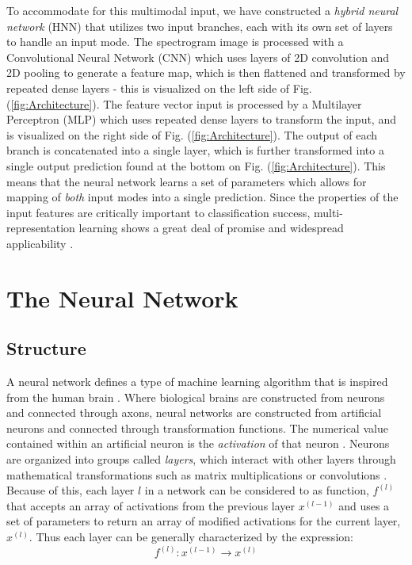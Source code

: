 \documentclass[conference,onecolumn,letterpaper]{IEEEtran}
\begin{document}
To accommodate for this multimodal input, we have constructed a \textit{hybrid neural network} (HNN) that utilizes two input branches, each with its own set of layers to handle an input mode. The spectrogram image is processed with a Convolutional Neural Network (CNN) which uses layers of 2D convolution and 2D pooling to generate a feature map, which is then flattened and transformed by repeated dense layers - this is visualized on the left side of Fig. (\ref{fig:Architecture}). The feature vector input is processed by a Multilayer Perceptron (MLP) which uses repeated dense layers to transform the input, and is visualized on the right side of Fig. (\ref{fig:Architecture}). The output of each branch is concatenated into a single layer, which is further transformed into a single output prediction found at the bottom on Fig. (\ref{fig:Architecture}). This means that the neural network learns a set of parameters which allows for mapping of \textit{both} input modes into a single prediction. Since the properties of the input features are critically important to classification success, multi-representation learning shows a great deal of promise and widespread applicability \cite{Khan,Li,Liu,Virtanen}. 


\section{The Neural Network}
\label{sec:NeuralNetwork}


\subsection{Structure}
\label{subsec:Intro}

A neural network defines a type of machine learning algorithm that is inspired from the human brain \cite{Geron,Goodfellow}. Where biological brains are constructed from neurons and connected through axons, neural networks are constructed from artificial neurons and connected through transformation functions. The numerical value contained within an artificial neuron is the \textit{activation} of that neuron \cite{Levine}. Neurons are organized into groups called \textit{layers}, which interact with other layers through mathematical transformations such as matrix multiplications or convolutions \cite{Goodfellow}. Because of this, each layer $l$ in a network can be considered to as function, $f^{(l)}$ that accepts an array of activations from the previous layer $x^{(l-1)}$ and uses a set of parameters to return an array of modified activations for the current layer, $x^{(l)}$. Thus each layer can be generally characterized by the expression:
\begin{equation}
    \label{eqn:LayerFunction}
    f^{(l)} : x^{(l-1)} \rightarrow x^{(l)}
\end{equation}
\end{document}
